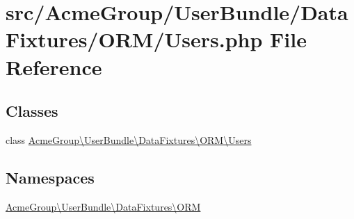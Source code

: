 \hypertarget{_users_8php}{\section{src/\+Acme\+Group/\+User\+Bundle/\+Data\+Fixtures/\+O\+R\+M/\+Users.php File Reference}
\label{_users_8php}
}
\subsection*{Classes}
\begin{DoxyCompactItemize}
\item 
class \hyperlink{class_acme_group_1_1_user_bundle_1_1_data_fixtures_1_1_o_r_m_1_1_users}{Acme\+Group\textbackslash{}\+User\+Bundle\textbackslash{}\+Data\+Fixtures\textbackslash{}\+O\+R\+M\textbackslash{}\+Users}
\end{DoxyCompactItemize}
\subsection*{Namespaces}
\begin{DoxyCompactItemize}
\item 
 \hyperlink{namespace_acme_group_1_1_user_bundle_1_1_data_fixtures_1_1_o_r_m}{Acme\+Group\textbackslash{}\+User\+Bundle\textbackslash{}\+Data\+Fixtures\textbackslash{}\+O\+R\+M}
\end{DoxyCompactItemize}
